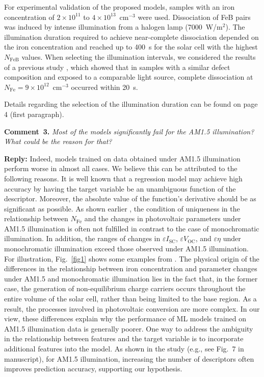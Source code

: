 \documentclass[a4paper,fleqn]{cas-sc}
\begin{document}
For experimental validation of the proposed models, samples with an iron concentration of $2\times10^{11}$ to $4\times10^{13}$~cm$^{-3}$ were used.
Dissociation of FeB pairs was induced by intense illumination from a halogen lamp (7000~W/m$^{2}$).
The illumination duration required to achieve near-complete dissociation depended on the iron concentration
and reached up to 400~s for the solar cell with the highest $N_\mathrm{FeB}$ values.
When selecting the illumination intervals, we considered the results of a previous study \cite{OlikhPSSA},
which showed that in samples with a similar defect composition and exposed to a comparable light source,
complete dissociation at $N_\mathrm{Fe}=9\times10^{12}$~cm$^{-3}$ occurred within 20~s.

Details regarding the selection of the illumination duration can be found on page 4 (first paragraph).




\vspace{1cm}
\noindent
\textcolor[rgb]{0.00,0.50,1.00}{\textbf{Comment~3.}}
\emph{Most of the models significantly fail for the AM1.5 illumination? What could be the reason for that?}

\noindent
\textcolor[rgb]{0.51,0.00,0.00}{\textbf{Reply:}}
Indeed, models trained on data obtained under AM1.5 illumination perform worse in almost all cases.
We believe this can be attributed to the following reasons.
It is well known that a regression model may  achieve high accuracy
by having the target variable be an unambiguous function of the descriptor.
Moreover, the absolute value of the function’s derivative should be as significant as possible.
As shown earlier  \cite{Olikh2025MSEB}, the condition of uniqueness in the relationship between $N_\mathrm{Fe}$ and
the changes in photovoltaic parameters under AM1.5 illumination is often not fulfilled in contrast to the case of monochromatic illumination.
In addition, the ranges of changes in $\varepsilon I_\mathrm{SC}$, $\varepsilon V_\mathrm{OC}$, and $\varepsilon \eta$
under monochromatic illumination exceed those observed under AM1.5 illumination.
For illustration, Fig.~\ref{fig1} shows some examples from  \cite{Olikh2025MSEB}.
The physical origin of the differences in the relationship between iron concentration and
parameter changes under AM1.5 and monochromatic illumination lies in the fact that,
in the former case, the generation of non-equilibrium charge carriers occurs throughout the
entire volume of the solar cell, rather than being limited to the base region.
As a result, the processes involved in photovoltaic conversion are more complex.
In our view, these differences explain why the performance of ML models trained on AM1.5 illumination data is generally poorer.
One way to address the ambiguity in the relationship between features and the target variable
is to incorporate additional features into the model.
As shown in the study (e.g., see Fig.~7 in manuscript),
for AM1.5 illumination, increasing the number of descriptors often improves prediction accuracy, supporting our hypothesis.
\end{document}
